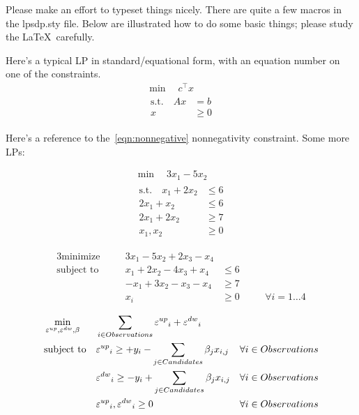 \documentclass[12pt]{article}
\begin{document}
Please make an effort to typeset things nicely.  There are quite a few macros in the lpsdp.sty file.  Below are illustrated how to do some basic things; please study the \LaTeX\ carefully.

Here's a typical LP in standard/equational form, with an equation number on one of the constraints.
\begin{gather}
    \min \quad c^\top x                       \nonumber\\
    \begin{aligned}
        \text{s.t.} \quad   Ax &= b           \nonumber\\
                             x &\geq 0       \label{eqn:nonnegative}
    \end{aligned}
\end{gather}

\noindent Here's a reference to the~\eqref{eqn:nonnegative} nonnegativity constraint.  Some more LPs:

\begin{gather*}
    \min \quad 3x_1 - 5x_2 \\
    \begin{aligned}
        \text{s.t.} \quad   x_1 + 2x_2 &\leq 6\\
                            2x_1 + x_2 &\leq 6\\
                            2x_1 + 2x_2 &\geq 7\\
                            x_1,x_2 &\geq 0
    \end{aligned}
\end{gather*}

\begin{alignat*}{3}
    \text{minimize}&   \quad & 3x_1 - 5x_2 + 2x_3 - x_4&       & &\\
    \text{subject to}& \quad & x_1 + 2x_2 - 4x_3 + x_4 &\leq 6 & &\\
                           & & -x_1 + 3x_2 - x_3 - x_4 &\geq 7 & &\\
                           & & x_i &\geq 0  & &\quad \forall i = 1\dots 4
\end{alignat*}

\begin{align}
    & \min_{\varepsilon^{up}, \varepsilon^{dw}, \beta}  &&  \sum_{i \in Observations} {\varepsilon^{up}}_i + {\varepsilon^{dw}}_i  && \notag \\
    & \text{subject to}     &&  {\varepsilon^{up}}_i \geq + y_i - \sum_{j \in Candidates} \beta_j x_{i,j} && \forall i \in Observations \notag \\
    &                       &&  {\varepsilon^{dw}}_i \geq - y_i + \sum_{j \in Candidates} \beta_j x_{i,j} && \forall i \in Observations \notag \\
    &                       &&  {\varepsilon^{up}}_i, {\varepsilon^{dw}}_i \geq 0 && \forall i \in Observations \notag \\
\end{align}
\end{document}
